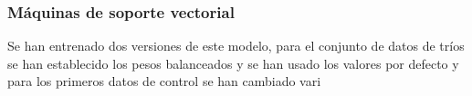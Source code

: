 \subsubsection{Máquinas de soporte vectorial}
Se han entrenado dos versiones de este modelo, para el conjunto de datos de tríos se han establecido los pesos balanceados y se han usado los valores por defecto y para los primeros datos de control se han cambiado vari


\endinput









